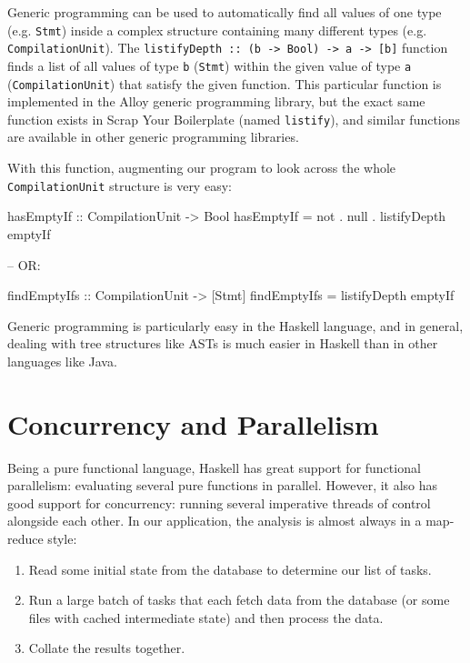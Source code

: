 \documentclass{tmr}
\begin{document}
Generic programming can be used to automatically find all values of one type (e.g. \lstinline|Stmt|) inside a complex structure containing many different types (e.g. \lstinline|CompilationUnit|).  The \lstinline|listifyDepth :: (b -> Bool) -> a -> [b]| function finds a list of all values of type \lstinline|b| (\lstinline|Stmt|) within the given value of type \lstinline|a| (\lstinline|CompilationUnit|) that satisfy the given function.  This particular function is implemented in the Alloy generic programming library, but the exact same function exists in Scrap Your Boilerplate (named \lstinline|listify|), and similar functions are available in other generic programming libraries.

With this function, augmenting our program to look across the whole \lstinline|CompilationUnit| structure is very easy:

\begin{code}
hasEmptyIf :: CompilationUnit -> Bool
hasEmptyIf = not . null . listifyDepth emptyIf

-- OR:

findEmptyIfs :: CompilationUnit -> [Stmt]
findEmptyIfs = listifyDepth emptyIf
\end{code}

Generic programming is particularly easy in the Haskell language, and in general, dealing with tree structures like ASTs is much easier in Haskell than in other languages like Java.

\section{Concurrency and Parallelism}

Being a pure functional language, Haskell has great support for functional parallelism: evaluating several pure functions in parallel.  However, it also has good support for concurrency: running several imperative threads of control alongside each other.  In our application, the analysis is almost always in a map-reduce style:

\begin{enumerate}
\item Read some initial state from the database to determine our list of tasks.
\item Run a large batch of tasks that each fetch data from the database (or some files with cached intermediate state) and then process the data.
\item Collate the results together.
\end{enumerate}
\end{document}
